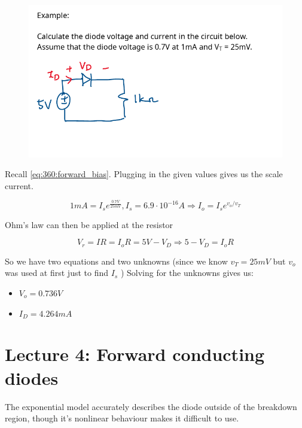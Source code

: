 \documentclass[10pt]{article}
\begin{document}
\begin{example}
	\begin{figure}[H]
		\centering
		\includegraphics[width=0.8\linewidth]{img/image_2022-09-13-13-55-18.png}
	\end{figure}

	Recall \eqref{eq:360:forward_bias}. Plugging in the given values gives us the scale current.

	\begin{equation}
		1mA = I_s e^{\frac{0.7V}{25mV}}, I_s = 6.9 \cdot 10^{-16} A \Rightarrow I_o = I_s e^{v_o/v_T}
	\end{equation}

	Ohm's law can then be applied at the resistor


	\begin{equation}
		V_r = IR = I_oR  = 5V - V_D \Rightarrow 5 - V_D = I_o R
	\end{equation}

	So we have two equations and two unknowns (since we know $ v_T = 25mV $ but $ v_o $ was used at first just to find $ I_s $ ) Solving for the unknowns gives us:

	\begin{itemize}
		\item $ V_o  = 0.736 V $
		\item $ I_D = 4.264 mA $ 
	\end{itemize}
\end{example}


\section{Lecture 4: Forward conducting diodes}


The exponential model accurately describes the diode outside of the breakdown region, though it's nonlinear behaviour makes it difficult to use.
\end{document}
